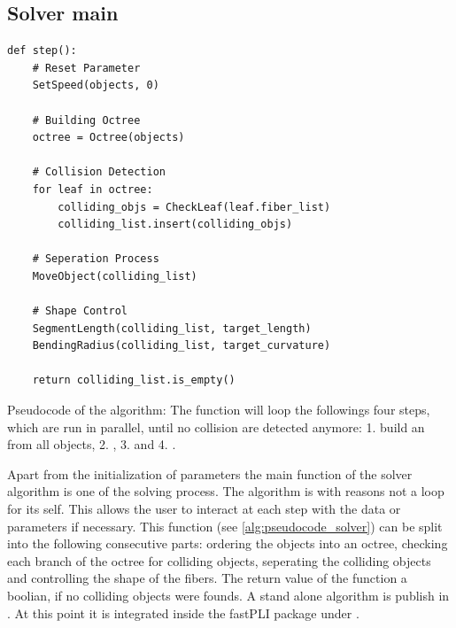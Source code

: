 \subsection{Solver main}
%
\begin{lstfloat}[!tb]
\lstset{style=python}
\begin{lstlisting}[]
def step():
    # Reset Parameter
    SetSpeed(objects, 0)
   
    # Building Octree
    octree = Octree(objects)
   
    # Collision Detection
    for leaf in octree:
        colliding_objs = CheckLeaf(leaf.fiber_list)
        colliding_list.insert(colliding_objs)

    # Seperation Process
    MoveObject(colliding_list)

    # Shape Control
    SegmentLength(colliding_list, target_length)
    BendingRadius(colliding_list, target_curvature)

    return colliding_list.is_empty()
\end{lstlisting}
\caption{Pseudocode of the  algorithm: The function  will loop the followings four steps, which are run in parallel, until no collision are detected anymore: 1. build an  from all objects, 2. , 3.  and 4. . }
\label{alg:pseudocode_solver}
\end{lstfloat}
%
Apart from the initialization of parameters the main function of the solver algorithm is one  of the solving process.
The algorithm is with reasons not a loop for its self. This allows the user to interact at each step with the data or parameters if necessary.
This  function (see \cref{alg:pseudocode_solver}) can be split into the following consecutive parts:
ordering the objects into an octree, checking each branch of the octree for colliding objects, seperating the colliding objects and controlling the shape of the fibers.
The return value of the function a boolian, if no colliding objects were founds.
A stand alone algorithm is publish in \cite{Matuschke2019}.
At this point it is integrated inside the \ac{fastPLI} package under .
%
%
%
